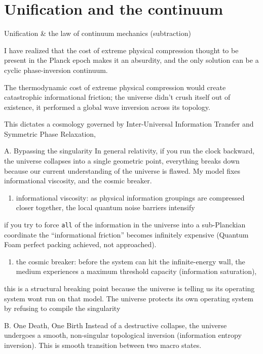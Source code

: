 \chapter{Unification and the continuum}

Unification \& the law of continuum mechanics (subtraction)

I have realized that the cost of extreme physical compression thought to be present in the Planck epoch makes it an absurdity, and the only solution can be a cyclic phase-inversion continuum.

The thermodynamic cost of extreme physical compression would create catastrophic informational friction; the universe didn't crush itself out of existence, it performed a global wave inversion across its topology.

This dictates a cosmology governed by Inter-Universal Information Transfer and Symmetric Phase Relaxation,

A. Bypassing the singularity In general relativity, if you run the clock backward, the universe collapses into a single geometric point, everything breaks down because our current understanding of the universe is flawed. My model fixes informational viscosity, and the cosmic breaker.

\begin{enumerate}
\item informational viscosity: as physical information groupings are compressed closer together, the local quantum noise barriers intensify
\end{enumerate}

if you try to force \texttt{all} of the information in the universe into a sub-Planckian coordinate the ``informational friction'' becomes infinitely expensive (Quantum Foam perfect packing achieved, not approached).

\begin{enumerate}
\item the cosmic breaker: before the system can hit the infinite-energy wall, the medium experiences a maximum threshold capacity (information saturation),
\end{enumerate}

this is a structural breaking point because the universe is telling us its operating system wont run on that model. The universe protects its own operating system by refusing to compile the singularity

B. One Death, One Birth Instead of a destructive collapse, the universe undergoes a smooth, non-singular topological inversion (information entropy inversion). This is smooth transition between two macro states.

